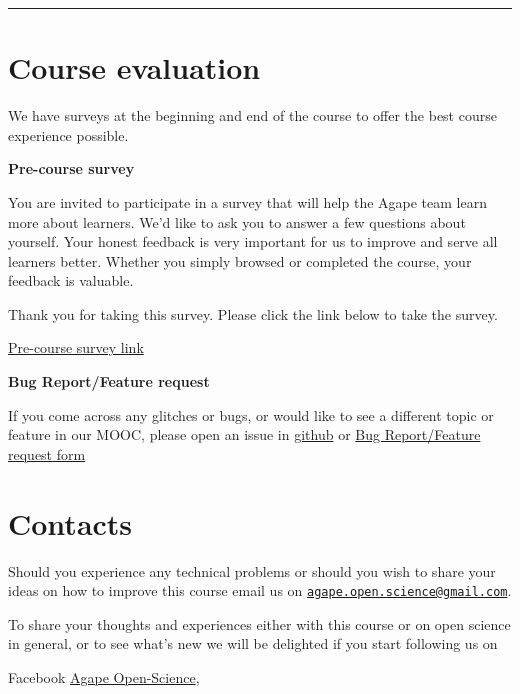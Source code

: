 \documentclass[
]{book}
\begin{document}
\begin{center}\rule{0.5\linewidth}{0.5pt}\end{center}

\hypertarget{course-evaluation}{%
\section*{Course evaluation}\label{course-evaluation}}

We have surveys at the beginning and end of the course to offer the best course experience possible.

\textbf{Pre-course survey}

You are invited to participate in a survey that will help the Agape team learn more about learners. We'd like to ask you to answer a few questions about yourself. Your honest feedback is very important for us to improve and serve all learners better. Whether you simply browsed or completed the course, your feedback is valuable.

Thank you for taking this survey. Please click the link below to take the survey.

\href{https://forms.gle/oBLgoyT6G7FvN9uR8}{Pre-course survey link}

\textbf{Bug Report/Feature request}

If you come across any glitches or bugs, or would like to see a different topic or feature in our MOOC, please open an issue in \href{https://github.com/agape-openscience/AgapeOpenscienceMOOC/issues}{github} or \href{https://forms.gle/oBLgoyT6G7FvN9uR8}{Bug Report/Feature request form}

\hypertarget{contacts}{%
\section*{Contacts}\label{contacts}}

Should you experience any technical problems or should you wish to share your ideas on how to improve this course email us on {\href{mailto:agape.open.science@gmail.com}{\nolinkurl{agape.open.science@gmail.com}}}.

To share your thoughts and experiences either with this course or on open science in general, or to see what's new we will be delighted if you start following us on

Facebook {\href{https://facebook.com/AgapeOpen-Science}{Agape Open-Science}},
\end{document}
